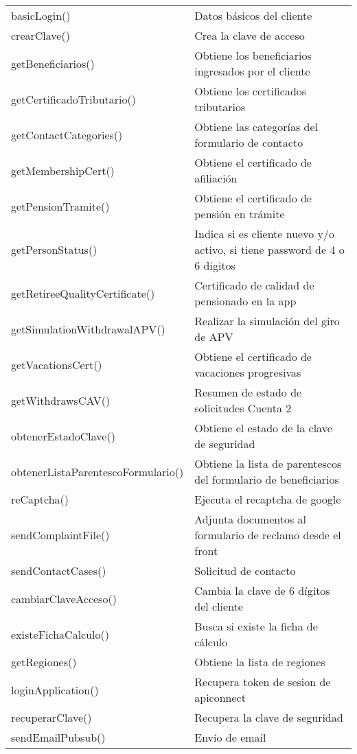 \begin{longtable}{|p{7cm}|p{8.5cm}|}
    basicLogin() &	Datos básicos del cliente \\
    crearClave() &	Crea la clave de acceso \\
    getBeneficiarios() &	Obtiene los beneficiarios ingresados por el cliente \\
    getCertificadoTributario() &	Obtiene los certificados tributarios \\
    getContactCategories() &	Obtiene las categorías del formulario de contacto \\
    getMembershipCert() &	Obtiene el certificado de afiliación \\
    getPensionTramite() &	Obtiene el certificado de pensión en trámite \\
    getPersonStatus() &	Indica si es cliente nuevo y/o activo, si tiene password de 4 o 6 digitos \\
    getRetireeQualityCertificate() &	Certificado de calidad de pensionado en la app \\
    getSimulationWithdrawalAPV() &	Realizar la simulación del giro de APV \\
    getVacationsCert() &	Obtiene el certificado de vacaciones progresivas \\
    getWithdrawsCAV() &	Resumen de estado de solicitudes Cuenta 2 \\
    obtenerEstadoClave() &	Obtiene el estado de la clave de seguridad \\
    obtenerListaParentescoFormulario() &	Obtiene la lista de parentescos del formulario de beneficiarios \\
    reCaptcha() &	Ejecuta el recaptcha de google \\
    sendComplaintFile() &	Adjunta documentos al formulario de reclamo desde el front \\
    sendContactCases() &	Solicitud de contacto \\
    cambiarClaveAcceso() &	Cambia la clave de 6 dígitos del cliente \\
    existeFichaCalculo() &	Busca si existe la ficha de cálculo \\
    getRegiones() &	Obtiene la lista de regiones \\
    loginApplication() &	Recupera token de sesion de apiconnect \\
    recuperarClave() &	Recupera la clave de seguridad \\
    sendEmailPubsub() &	Envío de email \\    
    \hline
\end{longtable}

